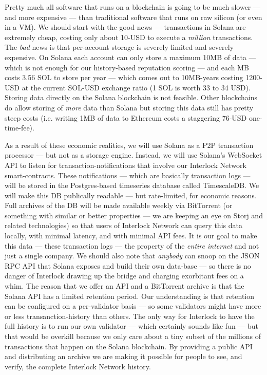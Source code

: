 \documentclass[a4paper]{article}
\begin{document}
Pretty much all software that runs on a blockchain is going to be much slower ---  and more expensive ---  than traditional software that runs on raw silicon (or even in a VM). We should start with the good news ---  transactions in Solana are extremely cheap, costing only about 10-USD to execute a \emph{million} transactions. The \emph{bad} news is that per-account storage is severely limited and severely expensive. On Solana each account can only store a maximum 10MB of data ---  which is not enough for our history-based reputation scoring ---  and each MB costs 3.56 SOL to store per year ---  which comes out to 10MB-years costing 1200-USD at the current SOL-USD exchange ratio (1 SOL is worth 33 to 34 USD). Storing data directly on the Solana blockchain is not feasible. Other blockchains do allow storing of \emph{more} data than Solana but storing this data still has pretty steep costs (i.e. writing 1MB of data to Ethereum costs a staggering 76-USD one-time-fee).

As a result of these economic realities, we will use Solana as a P2P transaction processor ---  but not as a storage engine. Instead, we will use Solana's WebSocket API to listen for transaction-notifications that involve our Interlock Network smart-contracts. These notifications ---  which are basically transaction logs ---  will be stored in the Postgres-based timeseries database called TimescaleDB. We will make this DB publically readable ---  but rate-limited, for economic reasons. Full archives of the DB will be made available weekly via BitTorrent (or something with similar or better properties ---  we are keeping an eye on Storj and related technologies) so that users of Interlock Network can query this data locally, with minimal latency, and with minimal API fees. It is our goal to make this data ---  these transaction logs ---  the property of the \emph{entire internet} and not just a single company. We should also note that \emph{anybody} can snoop on the JSON RPC API that Solana exposes and build their own data-base ---  so there is no danger of Interlock drawing up the bridge and charging exorbitant fees on a whim. The reason that we offer an API and a BitTorrent archive is that the Solana API has a limited retention period. Our understanding is that retention can be configured on a per-validator basis ---  so some validators might have more or less transanction-history than others. The only way for Interlock to have the full history is to run our own validator ---  which certainly sounds like fun ---  but that would be overkill because we only care about a tiny subset of the millions of transactions that happen on the Solana blockchain. By providing a public API and distributing an archive we are making it possible for people to see, and verify, the complete Interlock Network history.
\end{document}
